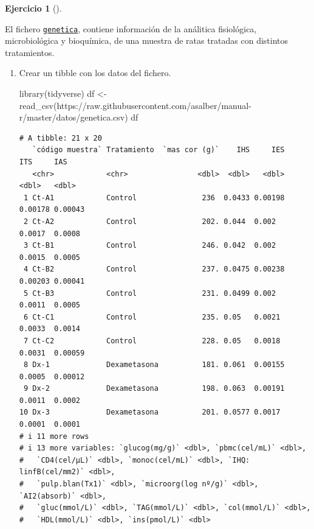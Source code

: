 \documentclass[
  spanish,
  a4paper,
]{scrreport}
\newenvironment{Shaded}{\begin{snugshade}}{\end{snugshade}}
\newcommand{\FunctionTok}[1]{\textcolor[rgb]{0.28,0.35,0.67}{#1}}
\newcommand{\NormalTok}[1]{\textcolor[rgb]{0.00,0.23,0.31}{#1}}
\newcommand{\OtherTok}[1]{\textcolor[rgb]{0.00,0.23,0.31}{#1}}
\newcommand{\StringTok}[1]{\textcolor[rgb]{0.13,0.47,0.30}{#1}}
\theoremstyle{definition}
\newtheorem{exercise}{Ejercicio}[chapter]
\theoremstyle{definition}
\theoremstyle{remark}
\begin{document}
\begin{exercise}[]\protect\hypertarget{exr-preprocesamiento-1}{}\label{exr-preprocesamiento-1}

El fichero
\href{https://raw.githubusercontent.com/asalber/manual-r/master/datos/genetica.csv}{\texttt{genetica}},
contiene información de la análitica fisiológica, microbiológica y
bioquímica, de una muestra de ratas tratadas con distintos tratamientos.

\begin{enumerate}
\def\labelenumi{\alph{enumi}.}
\item
  Crear un tibble con los datos del fichero.

  \begin{tcolorbox}[enhanced jigsaw, arc=.35mm, bottomrule=.15mm, bottomtitle=1mm, breakable, colback=white, colbacktitle=quarto-callout-note-color!10!white, colframe=quarto-callout-note-color-frame, coltitle=black, left=2mm, leftrule=.75mm, opacityback=0, opacitybacktitle=0.6, rightrule=.15mm, title=\textcolor{quarto-callout-note-color}{\faInfo}\hspace{0.5em}{Solución}, titlerule=0mm, toprule=.15mm, toptitle=1mm]

\begin{Shaded}
\begin{Highlighting}[]
\FunctionTok{library}\NormalTok{(tidyverse)}
\NormalTok{df }\OtherTok{\textless{}{-}} \FunctionTok{read\_csv}\NormalTok{(}\StringTok{\textquotesingle{}https://raw.githubusercontent.com/asalber/manual{-}r/master/datos/genetica.csv\textquotesingle{}}\NormalTok{)}
\NormalTok{df}
\end{Highlighting}
\end{Shaded}

\begin{verbatim}
# A tibble: 21 x 20
   `código muestra` Tratamiento  `mas cor (g)`    IHS     IES     ITS     IAS
   <chr>            <chr>                <dbl>  <dbl>   <dbl>   <dbl>   <dbl>
 1 Ct-A1            Control               236  0.0433 0.00198 0.00178 0.00043
 2 Ct-A2            Control               202. 0.044  0.002   0.0017  0.0008 
 3 Ct-B1            Control               246. 0.042  0.002   0.0015  0.0005 
 4 Ct-B2            Control               237. 0.0475 0.00238 0.00203 0.00041
 5 Ct-B3            Control               231. 0.0499 0.002   0.0011  0.0005 
 6 Ct-C1            Control               235. 0.05   0.0021  0.0033  0.0014 
 7 Ct-C2            Control               228. 0.05   0.0018  0.0031  0.00059
 8 Dx-1             Dexametasona          181. 0.061  0.00155 0.0005  0.00012
 9 Dx-2             Dexametasona          198. 0.063  0.00191 0.0011  0.0002 
10 Dx-3             Dexametasona          201. 0.0577 0.0017  0.0001  0.0001 
# i 11 more rows
# i 13 more variables: `glucog(mg/g)` <dbl>, `pbmc(cel/mL)` <dbl>,
#   `CD4(cel/µL)` <dbl>, `monoc(cel/mL)` <dbl>, `IHQ: linfB(cel/mm2)` <dbl>,
#   `pulp.blan(Tx1)` <dbl>, `microorg(log nº/g)` <dbl>, `AI2(absorb)` <dbl>,
#   `gluc(mmol/L)` <dbl>, `TAG(mmol/L)` <dbl>, `col(mmol/L)` <dbl>,
#   `HDL(mmol/L)` <dbl>, `ins(pmol/L)` <dbl>
\end{verbatim}


\end{tcolorbox}
\end{enumerate}
\end{exercise}
\end{document}
